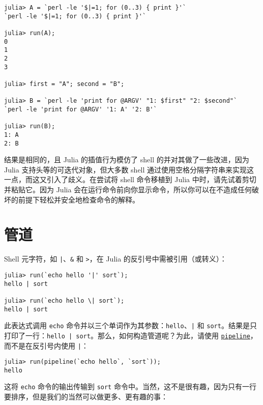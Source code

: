 \begin{verbatim}
julia> A = `perl -le '$|=1; for (0..3) { print }'`
`perl -le '$|=1; for (0..3) { print }'`

julia> run(A);
0
1
2
3

julia> first = "A"; second = "B";

julia> B = `perl -le 'print for @ARGV' "1: $first" "2: $second"`
`perl -le 'print for @ARGV' '1: A' '2: B'`

julia> run(B);
1: A
2: B
\end{verbatim}



结果是相同的，且 Julia 的插值行为模仿了 shell 的并对其做了一些改进，因为 Julia 支持头等的可迭代对象，但大多数 shell 通过使用空格分隔字符串来实现这一点，而这又引入了歧义。在尝试将 shell 命令移植到 Julia 中时，请先试着剪切并粘贴它。因为 Julia 会在运行命令前向你显示命令，所以你可以在不造成任何破坏的前提下轻松并安全地检查命令的解释。



\hypertarget{565642647898476823}{}


\section{管道}



Shell 元字符，如 \texttt{|}、\texttt{\&} 和 \texttt{>}，在 Julia 的反引号中需被引用（或转义）：




\begin{verbatim}
julia> run(`echo hello '|' sort`);
hello | sort

julia> run(`echo hello \| sort`);
hello | sort
\end{verbatim}



此表达式调用 \texttt{echo} 命令并以三个单词作为其参数：\texttt{hello}、\texttt{|} 和 \texttt{sort}。结果是只打印了一行：\texttt{hello | sort}。那么，如何构造管道呢？为此，请使用 \hyperlink{17710887576380723118}{\texttt{pipeline}}，而不是在反引号内使用 \texttt{{\textquotesingle}|{\textquotesingle}}：




\begin{verbatim}
julia> run(pipeline(`echo hello`, `sort`));
hello
\end{verbatim}



这将 \texttt{echo} 命令的输出传输到 \texttt{sort} 命令中。当然，这不是很有趣，因为只有一行要排序，但是我们的当然可以做更多、更有趣的事：




